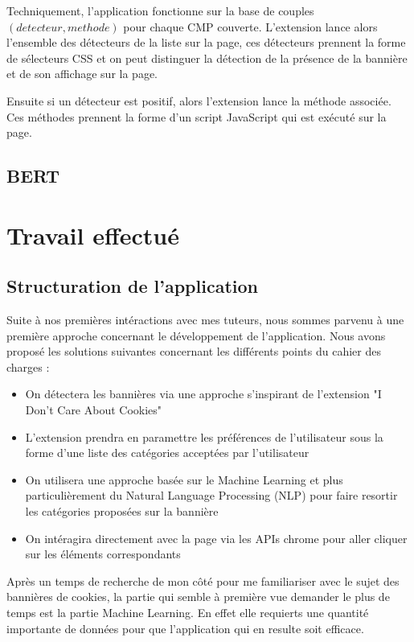 \documentclass[oneside,a4paper,12pt]{article}
\begin{document}
	Techniquement, l'application fonctionne sur la base de couples $(detecteur, methode)$ pour chaque CMP couverte.
	L'extension lance alors l'ensemble des détecteurs de la liste sur la page, ces détecteurs prennent la forme de sélecteurs CSS et on peut distinguer la détection de la présence de la bannière et de son affichage sur la page.
	
	Ensuite si un détecteur est positif, alors l'extension lance la méthode associée. Ces méthodes prennent la forme d'un script JavaScript qui est exécuté sur la page.
	\subsection{BERT}
	
	\section{Travail effectué}
	\subsection{Structuration de l'application}
	\label{structure}
	Suite à nos premières intéractions avec mes tuteurs, nous sommes parvenu à une première approche concernant le développement de l'application. Nous avons proposé les solutions suivantes concernant les différents points du cahier des charges :
	
	\begin{itemize}
		\item On détectera les bannières via une approche s'inspirant de l'extension "I Don't Care About Cookies"
		\item L'extension prendra en paramettre les préférences de l'utilisateur sous la forme d'une liste des catégories acceptées par l'utilisateur
		\item On utilisera une approche basée sur le Machine Learning et plus particulièrement du Natural Language Processing (NLP) pour faire resortir les catégories proposées sur la bannière
		\item On intéragira directement avec la page via les APIs chrome pour aller cliquer sur les éléments correspondants
	\end{itemize}

	Après un temps de recherche de mon côté pour me familiariser avec le sujet des bannières de cookies, la partie qui semble à première vue demander le plus de temps est la partie Machine Learning. En effet elle requierts une quantité importante de données pour que l'application qui en resulte soit efficace.
	
\end{document}
